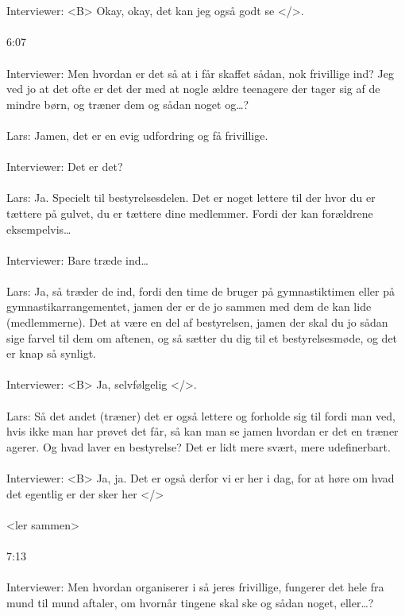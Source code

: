 \\\\
Interviewer: <B> Okay, okay, det kan jeg også godt se </>.
\\\\
6:07
\\\\
Interviewer: Men hvordan er det så at i får skaffet sådan, nok frivillige ind? Jeg ved jo at det ofte er det der med at nogle ældre teenagere der tager sig af de mindre børn, og træner dem og sådan noget og…?
\\\\
Lars: Jamen, det er en evig udfordring og få frivillige.
\\\\
Interviewer: Det er det?
\\\\
Lars: Ja. Specielt til bestyrelsesdelen. Det er noget lettere til der hvor du er tættere på gulvet, du er tættere dine medlemmer. Fordi der kan forældrene eksempelvis…
\\\\
Interviewer: Bare træde ind…
\\\\
Lars: Ja, så træder de ind, fordi den time de bruger på gymnastiktimen eller på gymnastikarrangementet, jamen der er de jo sammen med dem de kan lide (medlemmerne). Det at være en del af bestyrelsen, jamen der skal du jo sådan sige farvel til dem om aftenen, og så sætter du dig til et bestyrelsesmøde, og det er knap så synligt.
\\\\
Interviewer: <B> Ja, selvfølgelig </>.
\\\\
Lars: Så det andet (træner) det er også lettere og forholde sig til fordi man ved, hvis ikke man har prøvet det får, så kan man se jamen hvordan er det en træner agerer. Og hvad laver en bestyrelse? Det er lidt mere svært, mere udefinerbart.
\\\\
Interviewer: <B> Ja, ja. Det er også derfor vi er her i dag, for at høre om hvad det egentlig er der sker her </>
\\\\
<ler sammen>
\\\\
7:13
\\\\
Interviewer: Men hvordan organiserer i så jeres frivillige, fungerer det hele fra mund til mund aftaler, om hvornår tingene skal ske og sådan noget, eller…?
